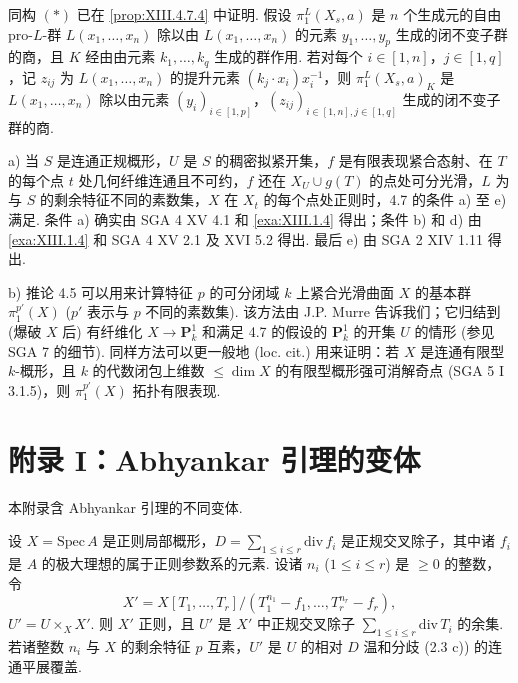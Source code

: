 同构 $(\ast)$ 已在 \ref{prop:XIII.4.7.4} 中证明. 假设 $\pi^L_1(X_s, a)$ 是 $n$ 个生成元的自由 pro-$L$-群 $L(x_1, \ldots, x_n)$ 除以由 $L(x_1, \ldots, x_n)$ 的元素 $y_1, \ldots, y_p$ 生成的闭不变子群的商，且 $K$ 经由由元素 $k_1, \ldots, k_q$ 生成的群作用. 若对每个 $i \in [1, n]$，$j \in [1, q]$，记 $z_{ij}$ 为 $L(x_1, \ldots, x_n)$ 的提升元素 $(k_j \cdot x_i)x^{-1}_i$，则 $\pi^L_1(X_s, a)_K$ 是 $L(x_1, \ldots, x_n)$ 除以由元素 $(y_i)_{i \in [1,p]}$，$(z_{ij})_{i \in [1,n], j \in [1,q]}$ 生成的闭不变子群的商.

\begin{remark}\label{rem:XIII.4.9}
a) 当 $S$ 是连通正规概形，$U$ 是 $S$ 的稠密拟紧开集，$f$ 是有限表现紧合态射、在 $T$ 的每个点 $t$ 处几何纤维连通且不可约，$f$ 还在 $X_U \cup g(T)$ 的点处可分光滑，$L$ 为与 $S$ 的剩余特征不同的素数集，$X$ 在 $X_t$ 的每个点处正则时，4.7 的条件 a) 至 e) 满足. 条件 a) 确实由 SGA 4 XV 4.1 和 \ref{exa:XIII.1.4} 得出；条件 b) 和 d) 由 \ref{exa:XIII.1.4} 和 SGA 4 XV 2.1 及 XVI 5.2 得出. 最后 e) 由 SGA 2 XIV 1.11 得出.

b) 推论 4.5 可以用来计算特征 $p$ 的可分闭域 $k$ 上紧合光滑曲面 $X$ 的基本群 $\pi^{p'}_1(X)$ ($p'$ 表示与 $p$ 不同的素数集). 该方法由 J.P. Murre 告诉我们；它归结到 (爆破 $X$ 后) 有纤维化 $X \to \mathbf{P}^1_k$ 和满足 4.7 的假设的 $\mathbf{P}^1_k$ 的开集 $U$ 的情形 (参见 SGA 7 的细节). 同样方法可以更一般地 (loc. cit.) 用来证明：若 $X$ 是连通有限型 $k$-概形，且 $k$ 的代数闭包上维数 $\leqslant \dim X$ 的有限型概形强可消解奇点 (SGA 5 I 3.1.5)，则 $\pi^{p'}_1(X)$ 拓扑有限表现.
\end{remark}

\section{附录 I：Abhyankar 引理的变体}

本附录含 Abhyankar 引理的不同变体.

\begin{proposition}\label{prop:XIII.5.1}
设 $X = \mathrm{Spec}\, A$ 是正则局部概形，$D = \sum_{1 \leqslant i \leqslant r} \mathrm{div}\, f_i$ 是正规交叉除子，其中诸 $f_i$ 是 $A$ 的极大理想的属于正则参数系的元素. 设诸 $n_i$ ($1 \leqslant i \leqslant r$) 是 $\geqslant 0$ 的整数，令
\[
X' = X[T_1, \ldots, T_r]/(T_1^{n_1} - f_1, \ldots, T_r^{n_r} - f_r),
\]
$U' = U \times_X X'$. 则 $X'$ 正则，且 $U'$ 是 $X'$ 中正规交叉除子 $\sum_{1 \leqslant i \leqslant r} \mathrm{div}\, T_i$ 的余集. 若诸整数 $n_i$ 与 $X$ 的剩余特征 $p$ 互素，$U'$ 是 $U$ 的相对 $D$ 温和分歧 (2.3 c)) 的连通平展覆盖.
\end{proposition}

